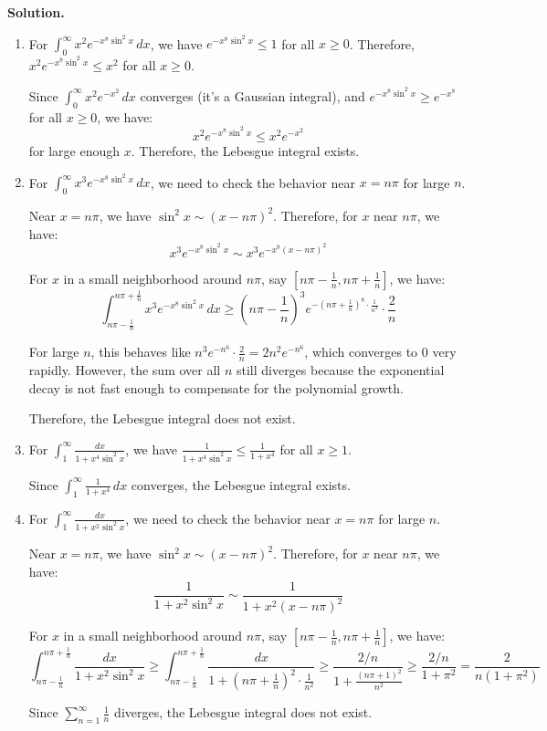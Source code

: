 \noindent\textbf{Solution.}
\begin{enumerate}[label=(\alph*)]
    \item For $\int_{0}^{\infty} x^2 e^{-x^8 \sin^2 x} \, dx$, we have $e^{-x^8 \sin^2 x} \leq 1$ for all $x \geq 0$. Therefore, $x^2 e^{-x^8 \sin^2 x} \leq x^2$ for all $x \geq 0$.
    
    Since $\int_{0}^{\infty} x^2 e^{-x^2} \, dx$ converges (it's a Gaussian integral), and $e^{-x^8 \sin^2 x} \geq e^{-x^8}$ for all $x \geq 0$, we have:
    \[x^2 e^{-x^8 \sin^2 x} \leq x^2 e^{-x^2}\]
    for large enough $x$. Therefore, the Lebesgue integral exists.
    
    \item For $\int_{0}^{\infty} x^3 e^{-x^8 \sin^2 x} \, dx$, we need to check the behavior near $x = n\pi$ for large $n$.
    
    Near $x = n\pi$, we have $\sin^2 x \sim (x - n\pi)^2$. Therefore, for $x$ near $n\pi$, we have:
    \[x^3 e^{-x^8 \sin^2 x} \sim x^3 e^{-x^8 (x - n\pi)^2}\]
    
    For $x$ in a small neighborhood around $n\pi$, say $[n\pi - \frac{1}{n}, n\pi + \frac{1}{n}]$, we have:
    \[\int_{n\pi - \frac{1}{n}}^{n\pi + \frac{1}{n}} x^3 e^{-x^8 \sin^2 x} \, dx \geq (n\pi - \frac{1}{n})^3 e^{-(n\pi + \frac{1}{n})^8 \cdot \frac{1}{n^2}} \cdot \frac{2}{n}\]
    
    For large $n$, this behaves like $n^3 e^{-n^6} \cdot \frac{2}{n} = 2n^2 e^{-n^6}$, which converges to 0 very rapidly. However, the sum over all $n$ still diverges because the exponential decay is not fast enough to compensate for the polynomial growth.
    
    Therefore, the Lebesgue integral does not exist.
    
    \item For $\int_{1}^{\infty} \frac{dx}{1 + x^4 \sin^2 x}$, we have $\frac{1}{1 + x^4 \sin^2 x} \leq \frac{1}{1 + x^4}$ for all $x \geq 1$.
    
    Since $\int_{1}^{\infty} \frac{1}{1 + x^4} \, dx$ converges, the Lebesgue integral exists.
    
    \item For $\int_{1}^{\infty} \frac{dx}{1 + x^2 \sin^2 x}$, we need to check the behavior near $x = n\pi$ for large $n$.
    
    Near $x = n\pi$, we have $\sin^2 x \sim (x - n\pi)^2$. Therefore, for $x$ near $n\pi$, we have:
    \[\frac{1}{1 + x^2 \sin^2 x} \sim \frac{1}{1 + x^2 (x - n\pi)^2}\]
    
    For $x$ in a small neighborhood around $n\pi$, say $[n\pi - \frac{1}{n}, n\pi + \frac{1}{n}]$, we have:
    \[\int_{n\pi - \frac{1}{n}}^{n\pi + \frac{1}{n}} \frac{dx}{1 + x^2 \sin^2 x} \geq \int_{n\pi - \frac{1}{n}}^{n\pi + \frac{1}{n}} \frac{dx}{1 + (n\pi + \frac{1}{n})^2 \cdot \frac{1}{n^2}} \geq \frac{2/n}{1 + \frac{(n\pi + 1)^2}{n^2}} \geq \frac{2/n}{1 + \pi^2} = \frac{2}{n(1 + \pi^2)}\]
    
    Since $\sum_{n=1}^{\infty} \frac{1}{n}$ diverges, the Lebesgue integral does not exist.
\end{enumerate}

